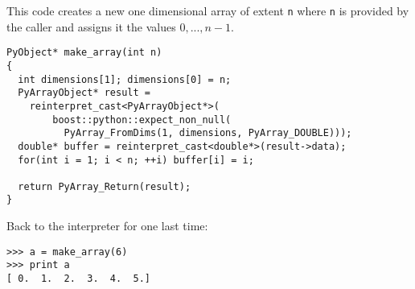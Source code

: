 This code creates a new one dimensional array of extent \verb|n| where
\verb|n| is provided by the caller and assigns it the values $0, ..., n - 1$.
\begin{verbatim}
PyObject* make_array(int n)
{
  int dimensions[1]; dimensions[0] = n;
  PyArrayObject* result =
    reinterpret_cast<PyArrayObject*>(
        boost::python::expect_non_null(
          PyArray_FromDims(1, dimensions, PyArray_DOUBLE)));
  double* buffer = reinterpret_cast<double*>(result->data);
  for(int i = 1; i < n; ++i) buffer[i] = i;

  return PyArray_Return(result);
}
\end{verbatim}
Back to the interpreter for one last time:
\begin{verbatim}
>>> a = make_array(6)
>>> print a
[ 0.  1.  2.  3.  4.  5.]

\end{verbatim}
